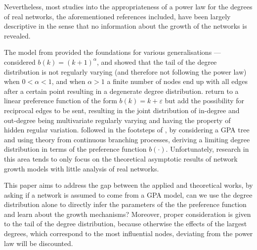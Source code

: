 \documentclass[
  sn-basic,
  10pt,
]{sn-jnl}
\theoremstyle{thmstyleone}
\theoremstyle{thmstyleone}
\theoremstyle{remark}
\theoremstyle{plain}
\theoremstyle{plain}
\theoremstyle{remark}
\begin{document}
Nevertheless, most studies into the appropriateness of a power law for
the degrees of real networks, the aforementioned references included,
have been largely descriptive in the sense that no information about the
growth of the networks is revealed.

The model from \citet{Barabasi99} provided the foundations for various
generalisations --- \citet{krapivsky01} considered
\(b(k) = (k+1)^\alpha\), and showed that the tail of the degree
distribution is not regularly varying (and therefore not following the
power law) when \(0<\alpha<1\), and when \(\alpha>1\) a finite number of
nodes end up with all edges after a certain point resulting in a
degenerate degree distribution. \citet{wang2022random} return to a
linear preference function of the form \(b(k) = k+\varepsilon\) but add
the possibility for reciprocal edges to be sent, resulting in the joint
distribution of in-degree and out-degree being multivariate regularly
varying and having the property of hidden regular variation.
\citet{rudas07} followed in the footsteps of \citet{krapivsky01}, by
considering a GPA tree and using theory from continuous branching
processes, deriving a limiting degree distribution in terms of the
preference function \(b(\cdot)\). Unfortunately, research in this area
tends to only focus on the theoretical asymptotic results of network
growth models with little analysis of real networks.

This paper aims to address the gap between the applied and theoretical
works, by asking if a network is assumed to come from a GPA model, can
we use the degree distribution alone to directly infer the parameters of
the the preference function and learn about the growth mechanisms?
Moreover, proper consideration is given to the tail of the degree
distribution, because otherwise the effects of the largest degrees,
which correspond to the most influential nodes, deviating from the power
law will be discounted.
\end{document}
